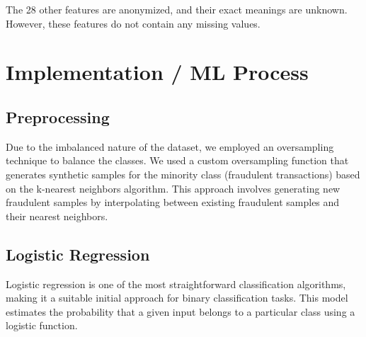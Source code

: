 \documentclass[a4, 10 pt, conference]{ieeeconf}  %
\begin{document}
The 28 other features are anonymized, and their exact meanings are unknown. However, these features do not contain any missing values.

\section{Implementation / ML Process}
\label{sec:methods}



\subsection{Preprocessing}
\label{sec:preprocess}
Due to the imbalanced nature of the dataset, we employed an oversampling technique to balance the classes. We used a custom
oversampling function that generates synthetic samples for the minority class (fraudulent transactions) based on the k-nearest
neighbors algorithm. This approach involves generating new fraudulent samples by interpolating between existing fraudulent
samples and their nearest neighbors.

\subsection{Logistic Regression}
Logistic regression is one of the most straightforward classification algorithms, making it a suitable initial approach for binary classification tasks.
This model estimates the probability that a given input belongs to a particular class using a logistic function.
\end{document}
